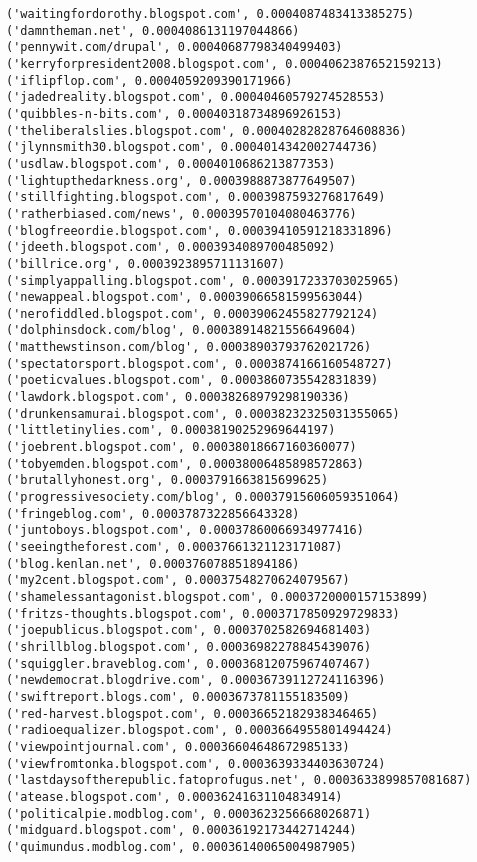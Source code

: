 \documentclass[11pt]{article}
\begin{document}
\begin{Verbatim}[commandchars=\\\{\}]
('waitingfordorothy.blogspot.com', 0.0004087483413385275)
('damntheman.net', 0.0004086131197044866)
('pennywit.com/drupal', 0.00040687798340499403)
('kerryforpresident2008.blogspot.com', 0.0004062387652159213)
('iflipflop.com', 0.0004059209390171966)
('jadedreality.blogspot.com', 0.00040460579274528553)
('quibbles-n-bits.com', 0.00040318734896926153)
('theliberalslies.blogspot.com', 0.00040282828764608836)
('jlynnsmith30.blogspot.com', 0.0004014342002744736)
('usdlaw.blogspot.com', 0.0004010686213877353)
('lightupthedarkness.org', 0.0003988873877649507)
('stillfighting.blogspot.com', 0.0003987593276817649)
('ratherbiased.com/news', 0.00039570104080463776)
('blogfreeordie.blogspot.com', 0.00039410591218331896)
('jdeeth.blogspot.com', 0.0003934089700485092)
('billrice.org', 0.0003923895711131607)
('simplyappalling.blogspot.com', 0.0003917233703025965)
('newappeal.blogspot.com', 0.00039066581599563044)
('nerofiddled.blogspot.com', 0.00039062455827792124)
('dolphinsdock.com/blog', 0.00038914821556649604)
('matthewstinson.com/blog', 0.00038903793762021726)
('spectatorsport.blogspot.com', 0.0003874166160548727)
('poeticvalues.blogspot.com', 0.0003860735542831839)
('lawdork.blogspot.com', 0.00038268979298190336)
('drunkensamurai.blogspot.com', 0.00038232325031355065)
('littletinylies.com', 0.00038190252969644197)
('joebrent.blogspot.com', 0.00038018667160360077)
('tobyemden.blogspot.com', 0.00038006485898572863)
('brutallyhonest.org', 0.0003791663815699625)
('progressivesociety.com/blog', 0.00037915606059351064)
('fringeblog.com', 0.0003787322856643328)
('juntoboys.blogspot.com', 0.00037860066934977416)
('seeingtheforest.com', 0.00037661321123171087)
('blog.kenlan.net', 0.000376078851894186)
('my2cent.blogspot.com', 0.00037548270624079567)
('shamelessantagonist.blogspot.com', 0.0003720000157153899)
('fritzs-thoughts.blogspot.com', 0.0003717850929729833)
('joepublicus.blogspot.com', 0.0003702582694681403)
('shrillblog.blogspot.com', 0.00036982278845439076)
('squiggler.braveblog.com', 0.00036812075967407467)
('newdemocrat.blogdrive.com', 0.00036739112724116396)
('swiftreport.blogs.com', 0.0003673781155183509)
('red-harvest.blogspot.com', 0.00036652182938346465)
('radioequalizer.blogspot.com', 0.0003664955801494424)
('viewpointjournal.com', 0.00036604648672985133)
('viewfromtonka.blogspot.com', 0.0003639334403630724)
('lastdaysoftherepublic.fatoprofugus.net', 0.0003633899857081687)
('atease.blogspot.com', 0.00036241631104834914)
('politicalpie.modblog.com', 0.0003623256668026871)
('midguard.blogspot.com', 0.00036192173442714244)
('quimundus.modblog.com', 0.00036140065004987905)

\end{Verbatim}
\end{document}
